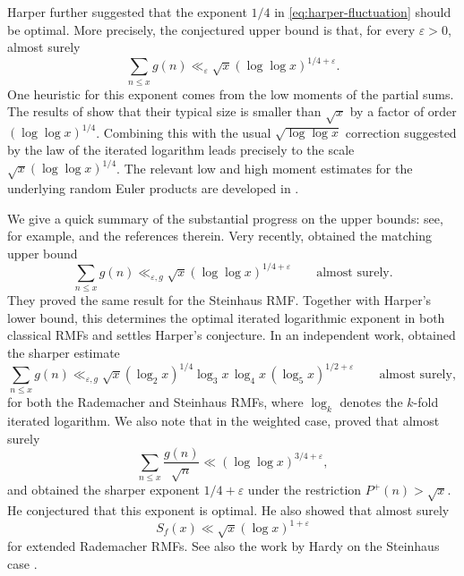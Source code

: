 \documentclass[a4paper,12pt,reqno]{amsart}
\numberwithin{equation}{section}
\theoremstyle{remark}
\begin{document}
Harper further suggested that the exponent $1/4$ in
\eqref{eq:harper-fluctuation} should be optimal.  More precisely, the
conjectured  upper bound is that, for every
$\varepsilon>0$, almost surely
\begin{equation}\label{eq:harper-conjectural-upper}
 \sum_{n\leq x}g(n)
 \ll_{\varepsilon}
 \sqrt{x}(\log\log x)^{1/4+\varepsilon}.
\end{equation}
One heuristic for this exponent comes from the low moments of the partial
sums.  The results of \citet{Harper2020Low} show that their typical size is
smaller than $\sqrt{x}$ by a factor of order
$(\log\log x)^{1/4}$.  Combining this with the usual
$\sqrt{\log\log x}$ correction suggested by the law of the iterated
logarithm leads precisely to the scale
$\sqrt{x}(\log\log x)^{1/4}$.  The relevant low and high moment estimates
for the underlying random Euler products are developed in
\cite{Harper2020Low,Harper2019High}.

We give a quick summary of the substantial progress on the upper bounds: see, for example,
\cite{Halasz1983,Basquin2012,LauTenenbaumWu2013,Mastrostefano2022,Caich2023}
and the references therein.
Very recently, \citet{DurkanPearceCrump2026} obtained the matching upper
bound
\begin{equation}\label{eq:durkan-pearce-crump-upper}
 \sum_{n\leq x}g(n)
 \ll_{\varepsilon,g}
 \sqrt{x}(\log\log x)^{1/4+\varepsilon}
 \qquad\text{almost surely}.
\end{equation}
They proved the same result for the Steinhaus RMF. Together with Harper's
lower bound, this determines the optimal iterated logarithmic exponent in
both classical RMFs and settles Harper's conjecture.
In an independent work, \citet{Verreault2026} obtained the sharper estimate
\begin{equation}\label{eq:verreault-upper}
 \sum_{n\leq x}g(n)
 \ll_{\varepsilon,g}
 \sqrt{x}(\log_2 x)^{1/4}
 \log_3 x\,\log_4 x\,(\log_5 x)^{1/2+\varepsilon}
 \qquad\text{almost surely},
\end{equation}
for both the Rademacher and Steinhaus RMFs, where $\log_k$ denotes the
$k$-fold iterated logarithm.  We also note that in the weighted case, 
\citet{Atherfold2025} proved that almost surely
$$\sum_{n\leq x}\frac{g(n)}{\sqrt n}\ll(\log\log x)^{3/4+\varepsilon},$$ and obtained
the sharper exponent $1/4+\varepsilon$ under the restriction
$P^+(n)>\sqrt x$. %
He conjectured that this exponent is optimal.  He also showed that {almost surely}
$$S_f(x)\ll\sqrt{x}(\log x)^{1+\varepsilon}$$ for extended
Rademacher RMFs. See also the work by Hardy on the Steinhaus case \cite{Hardy2024Weighted}.
\end{document}
